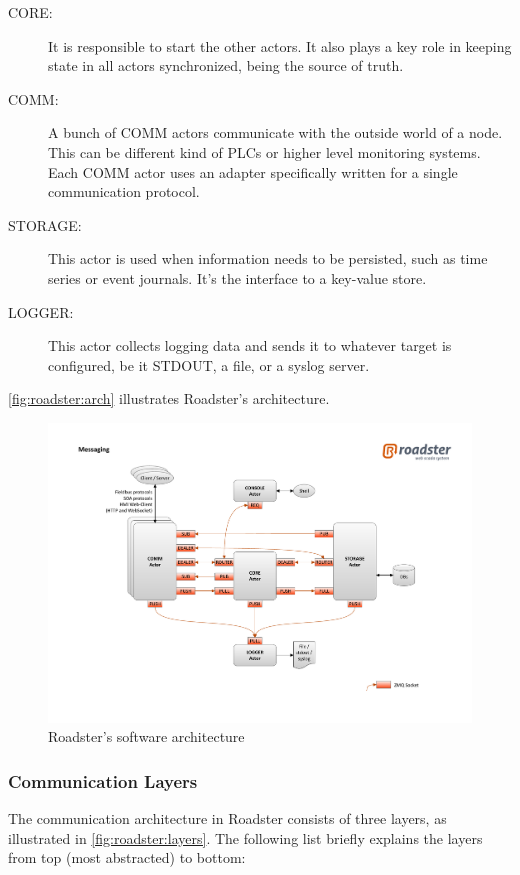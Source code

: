 \begin{description}
	\item [CORE:]
		It is responsible to start the other actors. It also plays a
		key role in keeping state in all actors synchronized, being the
		source of truth.

	\item [COMM:]
		A bunch of COMM actors communicate with the outside world of a
		node. This can be different kind of \glspl{PLC} or higher level
		monitoring systems. Each COMM actor uses an adapter
		specifically written for a single communication protocol.

	\item [STORAGE:]
		This actor is used when information needs to be persisted, such
		as time series or event journals. It's the interface to a
		key-value store.

	\item [LOGGER:]
		This actor collects logging data and sends it to whatever
		target is configured, be it STDOUT, a file, or a syslog server.
\end{description}

\autoref{fig:roadster:arch} illustrates Roadster's architecture.

\begin{figure}[!ht]
	\includegraphics[trim=4cm 2cm 3.5cm 2.8cm, clip=true, width=\textwidth]{img/roadster_arch.pdf}
	\caption{Roadster's software architecture}
	\label{fig:roadster:arch}
\end{figure}

\subsubsection{Communication Layers}
The communication architecture in Roadster consists of three layers, as
illustrated in \autoref{fig:roadster:layers}. The following list briefly
explains the layers from top (most abstracted) to bottom:

